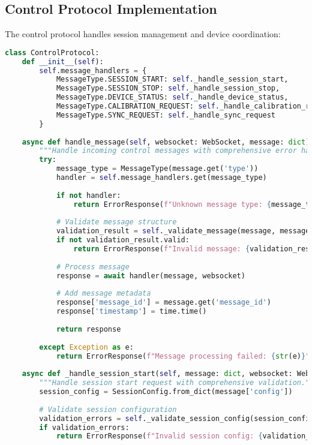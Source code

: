 \documentclass[11pt,a4paper]{report}
\begin{document}
\subsection{Control Protocol Implementation}

The control protocol handles session management and device coordination:

\begin{lstlisting}[language=Python]
class ControlProtocol:
    def __init__(self):
        self.message_handlers = {
            MessageType.SESSION_START: self._handle_session_start,
            MessageType.SESSION_STOP: self._handle_session_stop,
            MessageType.DEVICE_STATUS: self._handle_device_status,
            MessageType.CALIBRATION_REQUEST: self._handle_calibration_request,
            MessageType.SYNC_REQUEST: self._handle_sync_request
        }
    
    async def handle_message(self, websocket: WebSocket, message: dict) -> dict:
        """Handle incoming control messages with comprehensive error handling."""
        try:
            message_type = MessageType(message.get('type'))
            handler = self.message_handlers.get(message_type)
            
            if not handler:
                return ErrorResponse(f"Unknown message type: {message_type}")
            
            # Validate message structure
            validation_result = self._validate_message(message, message_type)
            if not validation_result.valid:
                return ErrorResponse(f"Invalid message: {validation_result.errors}")
            
            # Process message
            response = await handler(message, websocket)
            
            # Add message metadata
            response['message_id'] = message.get('message_id')
            response['timestamp'] = time.time()
            
            return response
            
        except Exception as e:
            return ErrorResponse(f"Message processing failed: {str(e)}")
    
    async def _handle_session_start(self, message: dict, websocket: WebSocket) -> dict:
        """Handle session start request with comprehensive validation."""
        session_config = SessionConfig.from_dict(message['config'])
        
        # Validate session configuration
        validation_errors = self._validate_session_config(session_config)
        if validation_errors:
            return ErrorResponse(f"Invalid session config: {validation_errors}")
        

\end{lstlisting}
\end{document}
